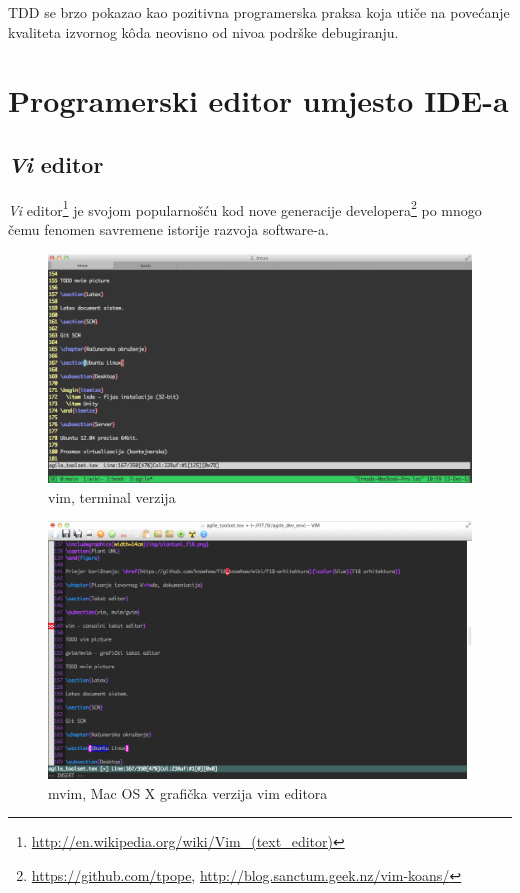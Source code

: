 \documentclass[times, utf8, seminar]{fit}
\begin{document}
TDD se brzo pokazao kao pozitivna programerska praksa koja utiče na povećanje kvaliteta izvornog k\^oda neovisno od nivoa podrške debugiranju. 

\section{Programerski editor umjesto IDE-a}

\subsection{\emph{Vi} editor} 

\emph{Vi} editor\footnote{\url{http://en.wikipedia.org/wiki/Vim_(text_editor)}} je svojom popularnošću kod nove generacije developera\footnote{\url{https://github.com/tpope}, \url{http://blog.sanctum.geek.nz/vim-koans/}} po mnogo čemu fenomen savremene istorije razvoja software-a.

\begin{figure}[H]
\centering
\includegraphics[width=14cm]{img/vim.png}
\caption{vim, terminal verzija}
\end{figure}

\begin{figure}[H]
\centering
\includegraphics[width=14cm]{img/mvim.png}
\caption{mvim, Mac OS X grafička verzija vim editora}
\end{figure}
\end{document}
